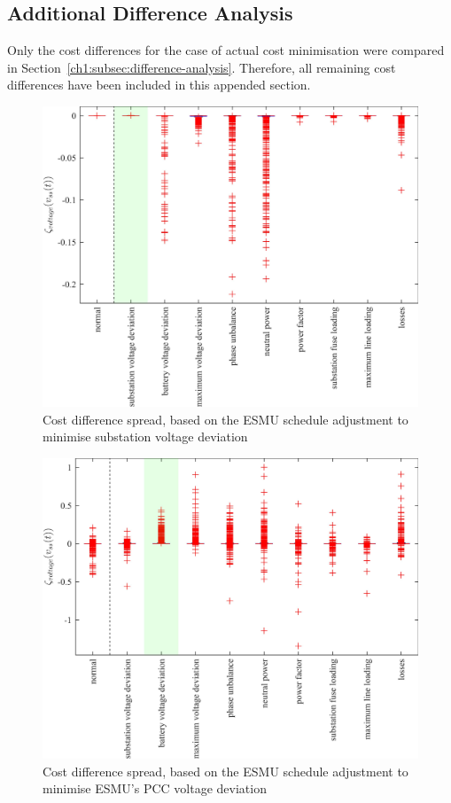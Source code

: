 \subsection{Additional Difference Analysis}
\label{appx-a:ch1:additional-difference-analysis}

Only the cost differences for the case of actual cost minimisation were compared in Section~\ref{ch1:subsec:difference-analysis}.
Therefore, all remaining cost differences have been included in this appended section.

\begin{figure}\centering
	\includegraphics{_chapter1/fig/appendix/minimising-substation-voltage-deviation}
	\caption{Cost difference spread, based on the ESMU schedule adjustment to minimise substation voltage deviation}
\end{figure}

\begin{figure}\centering
	\includegraphics{_chapter1/fig/appendix/minimising-battery-voltage-deviation}
	\caption{Cost difference spread, based on the ESMU schedule adjustment to minimise ESMU's PCC voltage deviation}
\end{figure}

